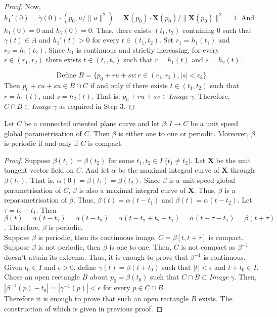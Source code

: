 \begin{proof}
	Now, $h_1'(0) = \dot{\gamma}(0) \cdot (p_0,u/\|u\|^2) = \boldsymbol{X}(p_0) \cdot \boldsymbol{X}(p_0)/\|\boldsymbol{X}(p_0)\|^2 = 1$.
	And $h_1(0) = 0$ and $h_2(0) = 0$.
	Thus, there exists $(t_1,t_2)$ containing $0$ such that $\gamma(t) \in A$ and $h_1'(t) > 0$ for every $t \in (t_1,t_2)$.
	Set $r_1 = h_1(t_1)$ and $r_2 = h_1(t_2)$.
	Since $h_1$ is continuous and strictly increasing, for every $r \in (r_1,r_2)$ there exists $t \in (t_1,t_2)$ such that $r=h_1(t)$ and $s = h_2(t)$.

	\begin{equation}
		\text{Define } B = \{ p_0 + ru + sv : r \in (r_1,r_2), |s| < \epsilon_2 \}
	\end{equation}
	Then $p_0 + ru + su \in B \cap C$ if and only if there exists $t \in (t_1,t_2)$ such that $r = h_1(t)$, and $s=h_2(t)$.
	That is, $p_0 + ru + sv \in Image\ \gamma$.
	Therefore, $C \cap B \subset Image\ \gamma$ as required in Step 3.
\end{proof}

\begin{theorem}
	Let $C$ be a connected oriented plane curve and let $\beta : I \to C$ be a unit speed global parametrisation of $C$.
	Then $\beta$ is either one to one or periodic.
	Moreover, $\beta$ is periodic if and only if $C$ is compact.
\end{theorem}
\begin{proof}
	Suppose $\beta(t_1) = \beta(t_2)$ for some $t_1,t_2 \in I$ ($t_1 \ne t_2$).
	Let $\boldsymbol{X}$ be the unit tangent vector field on $C$.
	And let $\alpha$ be the maximal integral curve of $\boldsymbol{X}$ through $\beta(t_1)$.
	That is, $\alpha(0) = \beta(t_1) = \beta(t_2)$.
	Since $\beta$ is a unit speed global parametrisation of $C$, $\beta$ is also a maximal integral curve of $\boldsymbol{X}$.
	Thus, $\beta$ is a reparametrisation of $\beta$.
	Thus, $\beta(t) = \alpha(t-t_1)$ and $\beta(t) = \alpha(t-t_2)$.
	Let $\tau = t_2-t_1$.
	Then $\beta(t) = \alpha(t-t_1) = \alpha(t-t_2) = \alpha(t-t_2+t_2-t_1) = \alpha(t+\tau-t_1) = \beta(t+\tau)$.
	Therefore, $\beta$ is periodic. \\


	Suppose $\beta$ is periodic, then its continuous image, $C = \beta[t,t+\tau]$ is compact.
	Suppose $\beta$ is not periodic, then $\beta$ is one to one.
	Then, $C$ is not compact as $\beta^{-1}$ doesn't attain its extrema.
	Thus, it is enough to prove that $\beta^{-1}$ is continuous.\\


	Given $t_0 \in I$ and $\epsilon > 0$, define $\gamma(t) = \beta(t+t_0)$ such that $|t| < \epsilon$ and $t+t_0 \in I$.
	Chose an open rectangle $B$ about $p_0 = \beta(t_0)$ such that $C \cap B \subset Image\ \gamma$.
	Then, $|\beta^{-1}(p) - t_0 | = | \gamma^{-1}(p) | < \epsilon$ for every $p \in C \cap B$.\\


	Therefore it is enough to prove that such an open rectangle $B$ exists.
	The construction of which is given in previous proof.
\end{proof}

